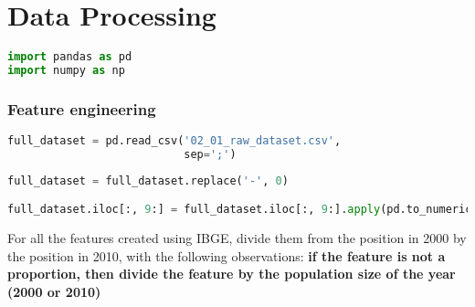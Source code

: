 \section{Data Processing}\label{data-processing}

\begin{lstlisting}[language=Python]
import pandas as pd
import numpy as np
\end{lstlisting}

\subsubsection{Feature engineering}\label{feature-engineering}

\begin{lstlisting}[language=Python]
full_dataset = pd.read_csv('02_01_raw_dataset.csv',
                           sep=';')
\end{lstlisting}

\begin{lstlisting}[language=Python]
full_dataset = full_dataset.replace('-', 0)

full_dataset.iloc[:, 9:] = full_dataset.iloc[:, 9:].apply(pd.to_numeric)
\end{lstlisting}

For all the features created using IBGE, divide them from the position
in 2000 by the position in 2010, with the following observations:
\textbf{if the feature is not a proportion, then divide the feature by
the population size of the year (2000 or 2010)}

